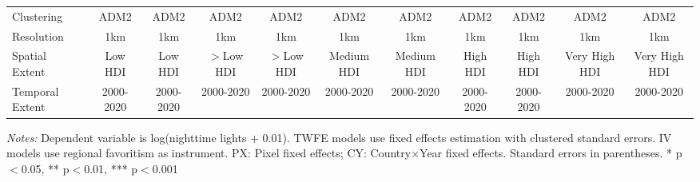 \begin{table}[htbp]
\begin{tabular}{lcccccccccc}
Clustering & ADM2 & ADM2 & ADM2 & ADM2 & ADM2 & ADM2 & ADM2 & ADM2 & ADM2 & ADM2 \\
Resolution & 1km & 1km & 1km & 1km & 1km & 1km & 1km & 1km & 1km & 1km \\
Spatial Extent & Low HDI & Low HDI & $>$Low HDI & $>$Low HDI & Medium HDI & Medium HDI & High HDI & High HDI & Very High HDI & Very High HDI \\
Temporal Extent & 2000-2020 & 2000-2020 & 2000-2020 & 2000-2020 & 2000-2020 & 2000-2020 & 2000-2020 & 2000-2020 & 2000-2020 & 2000-2020 \\
\bottomrule
\end{tabular}
\begin{threeparttable}
\begin{tablenotes}\small
\item \textit{Notes:} Dependent variable is log(nighttime lights + 0.01). TWFE models use  fixed effects estimation with clustered standard errors. IV models use regional favoritism as instrument. PX: Pixel fixed effects; CY: Country×Year fixed effects. Standard errors in parentheses. * p$<$0.05, ** p$<$0.01, *** p$<$0.001
\end{tablenotes}
\end{threeparttable}
\end{table}